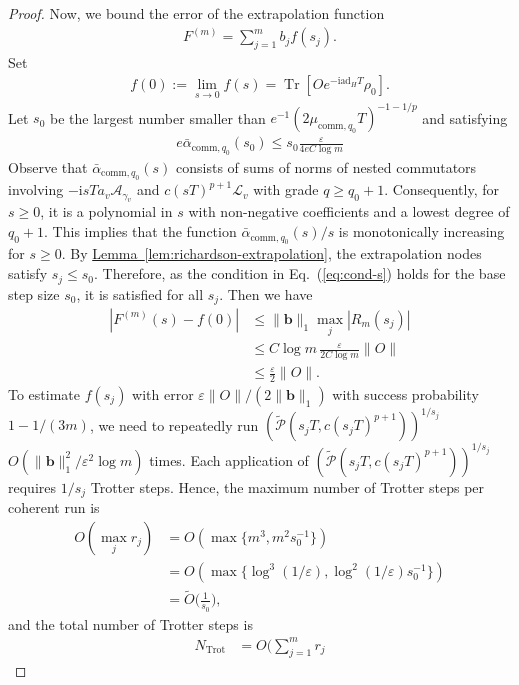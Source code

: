 \documentclass[aps,pra,reprint,groupedaddress,floatfix]{revtex4-2}
\newcommand{\eq}[1]{(\ref{eq:#1})}
\newcommand{\lem}[1]{\hyperref[lem:#1]{Lemma~\ref*{lem:#1}}}
\renewcommand{\i}{\mathrm{i}}
\newcommand{\ad}{\mathrm{ad}}
\newcommand{\eps}{\varepsilon}
\newcommand{\mc}{\mathcal}
\begin{document}
\begin{proof}
    Now, we bound the error of the extrapolation function \begin{align*}
        F^{(m)} = \sum_{j=1}^m b_j f(s_j).
    \end{align*}
    Set \begin{align*}
        f(0) :=\lim_{s\to 0} f(s) = \operatorname{Tr}[Oe^{-\i \ad_H T}\rho_0].
    \end{align*} Let $s_0$ be the largest number smaller than $e^{-1}(2\mu_{\mathrm{comm},q_0}T)^{-1-1/p}$ and satisfying \begin{align*}
        e\bar\alpha_{\mathrm{comm},q_0}(s_0)\le s_0\frac{\eps}{4eC \log m}
    \end{align*}
    Observe that $\bar\alpha_{\mathrm{comm}, q_0}(s)$ consists of sums of norms of nested commutators involving $-\i sT a_v \mc{A}_{\gamma_v}$ and $c(sT)^{p+1} \mc L_{v}$ with grade $q \ge q_0+1$. Consequently, for $s \ge 0$, it is a polynomial in $s$ with non-negative coefficients and a lowest degree of $q_0+1$. This implies that the function $\bar\alpha_{\mathrm{comm}, q_0}(s)/s$ is monotonically increasing for $s \ge 0$. 
    By \lem{richardson-extrapolation}, the extrapolation nodes satisfy $s_j \le s_0$. Therefore, as the condition in Eq.~\eq{cond-s} holds for the base step size $s_0$, it is satisfied for all $s_j$.
    Then we have
    \begin{align*}
        |F^{(m)}(s)-f(0)|
        &\le \|\mathbf{b}\|_1 \max_j|R_m(s_j)| \\
        &\le C\log m\,\frac{\eps}{2C\log m}\|O\|\\
        &\le \frac{\eps}{2}\|O\|.
    \end{align*}
    To estimate $f(s_j)$ with error $\eps\|O\|/(2\|\mathbf{b}\|_1)$ with success probability $1-1/(3m)$, we need to repeatedly run $(\tilde{\mc P}(s_jT, c(s_jT)^{p+1}))^{1/s_j}$ $O(\|\mathbf{b}\|_1^2/\eps^2\log m)$ times.  Each application of $(\tilde{\mc P}(s_jT, c(s_jT)^{p+1}))^{1/s_j}$ requires $1/s_j$ Trotter steps. Hence, the maximum number of Trotter steps per coherent run is \begin{align*}
        O(\max_j r_j) & = O( \max\{m^3, m^2s_0^{-1}\})\\
        &=O( \max\{\log^3(1/\eps), \log^2(1/\eps)s_0^{-1}\}) \\
        &= \widetilde{O}\Big(\frac{1}{s_0}\Big),
    \end{align*} and the total number of Trotter steps is
    \begin{align*}
        N_{\mathrm{Trot}}
        &=
        O\Big(\sum_{j=1}^m r_j

\end{align*}
\end{proof}
\end{document}
